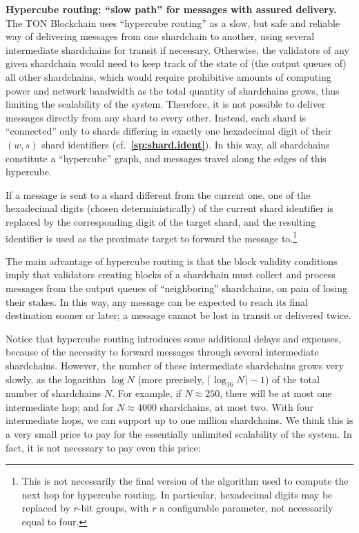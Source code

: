 \documentclass[12pt,oneside]{article}
\def\makepoint#1{\medbreak\noindent{\bf #1.\ }}
\def\nxsubpoint{\refstepcounter{subsubsection}%
  \smallbreak\makepoint{\thesubsubsection}}
\def\refpoint#1{{\rm\textbf{\ref{#1}}}}
\let\ptref=\refpoint
\def\embt(#1.){\textbf{#1.}}
\begin{document}
\nxsubpoint\label{sp:hypercube} \embt(Hypercube routing: ``slow path''
for messages with assured delivery.)  The TON Blockchain uses
``hypercube routing'' as a slow, but safe and reliable way of
delivering messages from one shardchain to another, using several
intermediate shardchains for transit if necessary.  Otherwise,
the validators of any given shardchain would need to keep track of the
state of (the output queues of) all other shardchains, which would
require prohibitive amounts of computing power and network bandwidth
as the total quantity of shardchains grows, thus limiting the
scalability of the system.  Therefore, it is not possible to deliver
messages directly from any shard to every other. Instead, each shard
is ``connected'' only to shards differing in exactly one hexadecimal
digit of their $(w,s)$ shard identifiers
(cf.~\ptref{sp:shard.ident}). In this way, all shardchains constitute
a ``hypercube'' graph, and messages travel along the edges of this
hypercube.

If a message is sent to a shard different from the current one, one of
the hexadecimal digits (chosen deterministically) of the current shard
identifier is replaced by the corresponding digit of the target shard,
and the resulting identifier is used as the proximate target to
forward the message to.\footnote{This is not necessarily the final
  version of the algorithm used to compute the next hop for hypercube
  routing. In particular, hexadecimal digits may be replaced by
  $r$-bit groups, with $r$ a configurable parameter, not necessarily
  equal to four.}

The main advantage of hypercube routing is that the block validity
conditions imply that validators creating blocks of a shardchain must
collect and process messages from the output queues of ``neighboring''
shardchains, on pain of losing their stakes. In this way, any message
can be expected to reach its final destination sooner or later; a
message cannot be lost in transit or delivered twice.

Notice that hypercube routing introduces some additional delays and
expenses, because of the necessity to forward messages through several
intermediate shardchains. However, the number of these intermediate
shardchains grows very slowly, as the logarithm $\log N$ (more
precisely, $\lceil\log_{16}N\rceil-1$) of the total number of
shardchains $N$. For example, if $N\approx250$, there will be at most
one intermediate hop; and for $N\approx4000$ shardchains, at most
two. With four intermediate hops, we can support up to one million
shardchains. We think this is a very small price to pay for the
essentially unlimited scalability of the system. In fact, it is not
necessary to pay even this price:
\end{document}
